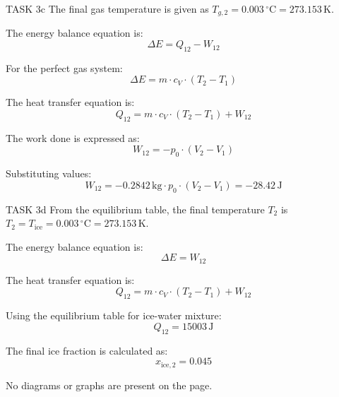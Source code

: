 TASK 3c  
The final gas temperature is given as \( T_{g,2} = 0.003 \, ^\circ\text{C} = 273.153 \, \text{K} \).  

The energy balance equation is:  
\[
\Delta E = Q_{12} - W_{12}
\]  

For the perfect gas system:  
\[
\Delta E = m \cdot c_V \cdot (T_2 - T_1)
\]  

The heat transfer equation is:  
\[
Q_{12} = m \cdot c_V \cdot (T_2 - T_1) + W_{12}
\]  

The work done is expressed as:  
\[
W_{12} = -p_0 \cdot (V_2 - V_1)
\]  

Substituting values:  
\[
W_{12} = -0.2842 \, \text{kg} \cdot p_0 \cdot (V_2 - V_1) = -28.42 \, \text{J}
\]  

TASK 3d  
From the equilibrium table, the final temperature \( T_2 \) is \( T_2 = T_{\text{ice}} = 0.003 \, ^\circ\text{C} = 273.153 \, \text{K} \).  

The energy balance equation is:  
\[
\Delta E = W_{12}
\]  

The heat transfer equation is:  
\[
Q_{12} = m \cdot c_V \cdot (T_2 - T_1) + W_{12}
\]  

Using the equilibrium table for ice-water mixture:  
\[
Q_{12} = 15003 \, \text{J}
\]  

The final ice fraction is calculated as:  
\[
x_{\text{ice},2} = 0.045
\]  

No diagrams or graphs are present on the page.